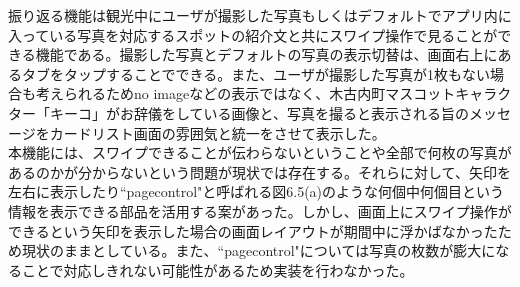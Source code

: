 振り返る機能は観光中にユーザが撮影した写真もしくはデフォルトでアプリ内に入っている写真を対応するスポットの紹介文と共にスワイプ操作で見ることができる機能である。撮影した写真とデフォルトの写真の表示切替は、画面右上にあるタブをタップすることでできる。また、ユーザが撮影した写真が1枚もない場合も考えられるためno imageなどの表示ではなく、木古内町マスコットキャラクター「キーコ」がお辞儀をしている画像と、写真を撮ると表示される旨のメッセージをカードリスト画面の雰囲気と統一をさせて表示した。\\
本機能には、スワイプできることが伝わらないということや全部で何枚の写真があるのかが分からないという問題が現状では存在する。それらに対して、矢印を左右に表示したり``pagecontrol"と呼ばれる図6.5(a)のような何個中何個目という情報を表示できる部品を活用する案があった。しかし、画面上にスワイプ操作ができるという矢印を表示した場合の画面レイアウトが期間中に浮かばなかったため現状のままとしている。また、``pagecontrol"については写真の枚数が膨大になることで対応しきれない可能性があるため実装を行わなかった。

\newpage

